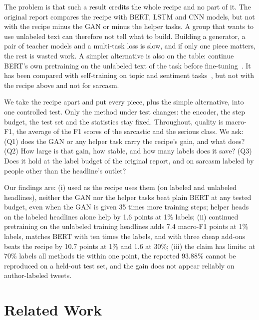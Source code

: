 \documentclass[conference]{IEEEtran}
\begin{document}
The problem is that such a result credits the whole recipe and no part of it. The original report compares the recipe with BERT, LSTM and CNN models, but not with the recipe minus the GAN or minus the helper tasks. A group that wants to use unlabeled text can therefore not tell what to build. Building a generator, a pair of teacher models and a multi-task loss is slow, and if only one piece matters, the rest is wasted work. A simpler alternative is also on the table: continue BERT's own pretraining on the unlabeled text of the task before fine-tuning~\cite{gururangan2020dont}. It has been compared with self-training on topic and sentiment tasks~\cite{shi2023rethinking}, but not with the recipe above and not for sarcasm.

We take the recipe apart and put every piece, plus the simple alternative, into one controlled test. Only the method under test changes: the encoder, the step budget, the test set and the statistics stay fixed. Throughout, quality is macro-F1, the average of the F1 scores of the sarcastic and the serious class. We ask: (Q1) does the GAN or any helper task carry the recipe's gain, and what does? (Q2) How large is that gain, how stable, and how many labels does it save? (Q3) Does it hold at the label budget of the original report, and on sarcasm labeled by people other than the headline's outlet?

Our findings are:
(i) used as the recipe uses them (on labeled and unlabeled headlines), neither the GAN nor the helper tasks beat plain BERT at any tested budget, even when the GAN is given 35 times more training steps; helper heads on the labeled headlines alone help by 1.6 points at 1\% labels;
(ii) continued pretraining on the unlabeled training headlines adds 7.4 macro-F1 points at 1\% labels, matches BERT with ten times the labels, and with three cheap add-ons beats the recipe by 10.7 points at 1\% and 1.6 at 30\%;
(iii) the claim has limits: at 70\% labels all methods tie within one point, the reported 93.88\% cannot be reproduced on a held-out test set, and the gain does not appear reliably on author-labeled tweets.

\section{Related Work}
\end{document}
